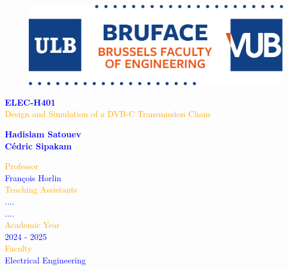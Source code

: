 \begin{titlepage}
	\begin{center}
            \begin{figure}
                \centering
                \includegraphics[scale=0.3]{Images/logo.png}
            \end{figure}
		\vspace*{\fill}
            \normalsize
            {\selectfont
            \textcolor{blue}{\textbf{ELEC-H401}}}\\
            \vspace{0.2cm}
		\Huge
            {\selectfont
            \textcolor{orange}{Design and Simulation of a DVB-C Transmission Chain}}\\
        \end{center}
	\begin{center}	
		\vspace{0.5cm}
            \Large
            {\selectfont
			\textcolor{blue}{\textbf{Hadislam Satouev\\
                                 	 Cédric Sipakam
             }}}\\
	\end{center}
        \vspace*{\fill}
        \begin{FlushRight}
            {\selectfont
            \textcolor{orange}{Professor}}\\
            {\selectfont
            \textcolor{blue}{François Horlin}}\\
            \vspace{0.6cm}
            {\selectfont
            \textcolor{orange}{Teaching Assistants}}\\
            {\selectfont
            \textcolor{blue}{
                ....\\
                 ....
            }}\\
            \vspace{0.6cm}
            {\selectfont
            \textcolor{orange}{Academic Year}}\\
            {\selectfont
            \textcolor{blue}{2024 - 2025}}\\
            \vspace{0.6cm}
            {\selectfont
            \textcolor{orange}{Faculty}}\\
            {\selectfont
            \textcolor{blue}{Electrical Engineering}}
        \end{FlushRight}



\end{titlepage}